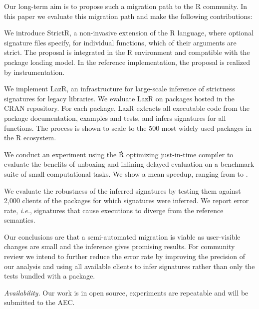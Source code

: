 \documentclass[review,creen,acmsmall]{acmart}
\newcommand{\strictr}{{\sf StrictR}\xspace}
\newcommand{\lazr}{{\sf LazR}\xspace}
\renewcommand{\Rsh}{{\sf\v R}\xspace}
\newcommand{\ie}{\emph{i.e.},\xspace}
\begin{document}
\medskip
\noindent Our long-term aim is to propose such a migration path to the R community. In
this paper we evaluate this migration path and make the following contributions:
\vspace{1mm}

\begin{compactitem}[---]
\item We introduce \strictr, a non-invasive extension of the R language, where
  optional signature files specify, for individual functions, which of their
  arguments are strict. The proposal is integrated in the R environment and
  compatible with the package loading model. In the reference implementation, the
  proposal is realized by instrumentation.
\item We implement \lazr, an infrastructure for large-scale inference of
  strictness signatures for legacy libraries. We evaluate \lazr on packages
  hosted in the CRAN repository. For each package, \lazr extracts all executable
  code from the package documentation, examples and tests, and infers signatures
  for all functions. The process is shown to scale to the 500 most widely used
  packages in the R ecosystem.
\item We conduct an experiment using the \Rsh optimizing just-in-time compiler
  to evaluate the benefits of unboxing and inlining delayed evaluation on a
  benchmark suite of small computational tasks. We show a mean
  \speedupRshStrict speedup, ranging from \speedupRshStrictMin to
  \speedupRshStrictMax.
\item We evaluate the robustness of the inferred signatures by testing them
  against 2,000 clients of the packages for which signatures were inferred. We
  report \robustnesResult error rate, \ie signatures that cause executions to
  diverge from the reference semantics.

\end{compactitem}

\medskip

\noindent Our conclusions are that a semi-automated migration is viable as
user-visible changes are small and the inference gives promising results. For
community review we intend to further reduce the error rate by improving the
precision of our analysis and using all available clients to infer signatures
rather than only the tests bundled with a package.

{\small \medskip\noindent\emph{Availability.} Our work is in open source, experiments are
repeatable and will be submitted to the AEC.}
\end{document}

